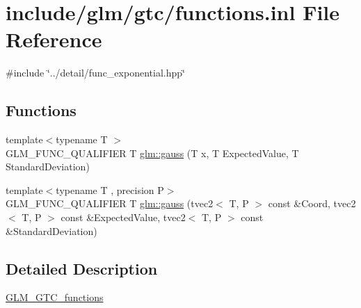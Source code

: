 \hypertarget{functions_8inl}{}\section{include/glm/gtc/functions.inl File Reference}
\label{functions_8inl}
{\ttfamily \#include \char`\"{}../detail/func\+\_\+exponential.\+hpp\char`\"{}}\newline
\subsection*{Functions}
\begin{DoxyCompactItemize}
\item 
{\footnotesize template$<$typename T $>$ }\\G\+L\+M\+\_\+\+F\+U\+N\+C\+\_\+\+Q\+U\+A\+L\+I\+F\+I\+ER T \hyperlink{group__gtc__functions_ga0b50b197ff74261a0fad90f4b8d24702}{glm\+::gauss} (T x, T Expected\+Value, T Standard\+Deviation)
\item 
{\footnotesize template$<$typename T , precision P$>$ }\\G\+L\+M\+\_\+\+F\+U\+N\+C\+\_\+\+Q\+U\+A\+L\+I\+F\+I\+ER T \hyperlink{group__gtc__functions_ga7448f9eb74bb5924f6330ab532f2899c}{glm\+::gauss} (tvec2$<$ T, P $>$ const \&Coord, tvec2$<$ T, P $>$ const \&Expected\+Value, tvec2$<$ T, P $>$ const \&Standard\+Deviation)
\end{DoxyCompactItemize}


\subsection{Detailed Description}
\hyperlink{group__gtc__functions}{G\+L\+M\+\_\+\+G\+T\+C\+\_\+functions} 